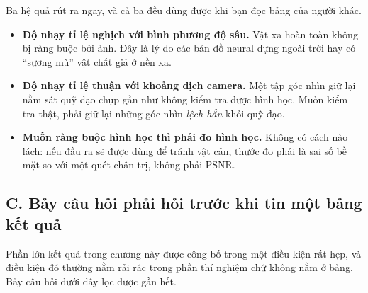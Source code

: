 \documentclass[../../deep_learning.tex]{subfiles}
\begin{document}
Ba hệ quả rút ra ngay, và cả ba đều dùng được khi bạn đọc bảng của người khác.

\begin{itemize}
\item \textbf{Độ nhạy tỉ lệ nghịch với bình phương độ sâu.} Vật xa hoàn toàn không bị ràng buộc bởi ảnh. Đây là lý do các bản đồ neural dựng ngoài trời hay có ``sương mù'' vật chất giả ở nền xa.
\item \textbf{Độ nhạy tỉ lệ thuận với khoảng dịch camera.} Một tập góc nhìn giữ lại nằm sát quỹ đạo chụp gần như không kiểm tra được hình học. Muốn kiểm tra thật, phải giữ lại những góc nhìn \emph{lệch hẳn} khỏi quỹ đạo.
\item \textbf{Muốn ràng buộc hình học thì phải đo hình học.} Không có cách nào lách: nếu đầu ra sẽ được dùng để tránh vật cản, thước đo phải là sai số bề mặt so với một quét chân trị, không phải PSNR.
\end{itemize}

\subsection{C. Bảy câu hỏi phải hỏi trước khi tin một bảng kết quả}
Phần lớn kết quả trong chương này được công bố trong một điều kiện rất hẹp, và điều kiện đó thường nằm rải rác trong phần thí nghiệm chứ không nằm ở bảng. Bảy câu hỏi dưới đây lọc được gần hết.
\end{document}
